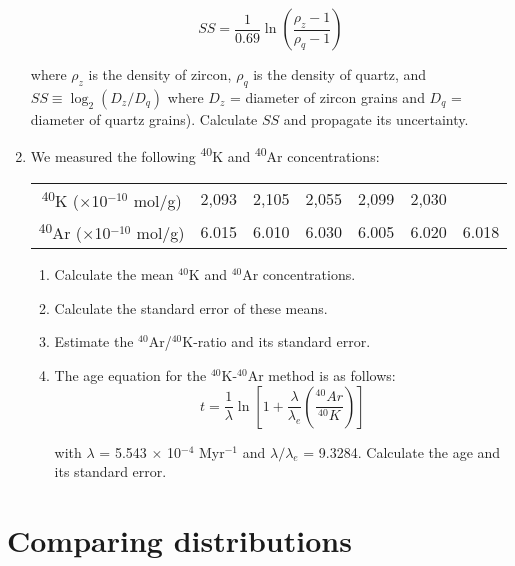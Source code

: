 \begin{enumerate}
\[
SS = \frac{1}{0.69}\ln\left(\frac{\rho_z-1}{\rho_q-1}\right)
\]

where $\rho_z$ is the density of zircon, $\rho_q$ is the density of
quartz, and $SS \equiv \log_2(D_z/D_q)$ where $D_z$ = diameter of
zircon grains and $D_q$ = diameter of quartz grains). Calculate $SS$
and propagate its uncertainty.

\item We measured the following \textsuperscript{40}K and
  \textsuperscript{40}Ar concentrations:
  \begin{center}
    \begin{tabular}{c|cccccc}
      \textsuperscript{40}K ($\times$10$^{-10}$ mol/g) & 2,093 & 2,105 & 2,055 & 2,099 & 2,030 & ~ \\
      \textsuperscript{40}Ar ($\times$10$^{-10}$ mol/g) & 6.015 & 6.010 & 6.030 & 6.005 & 6.020 & 6.018 
    \end{tabular}
  \end{center}
\begin{enumerate}
\item Calculate the mean $^{40}$K and $^{40}$Ar concentrations.
\item Calculate the standard error of these means.
\item Estimate the $^{40}$Ar/$^{40}$K-ratio and its standard error.
\item The age equation for the $^{40}$K-$^{40}$Ar method is as follows:
\[
t = \frac{1}{\lambda} \ln\left[ 1 + \frac{\lambda}{\lambda_e}
  \left(\frac{^{40}Ar }{^{40}K}\right) \right]
\]

with $\lambda$ = 5.543 $\times$ 10$^{-4}$ Myr$^{-1}$ and
$\lambda/\lambda_e$ = 9.3284.  Calculate the age and its standard error.
\end{enumerate}

\end{enumerate}

\section{Comparing distributions}
\label{sec:ex-comparingdistributions}

